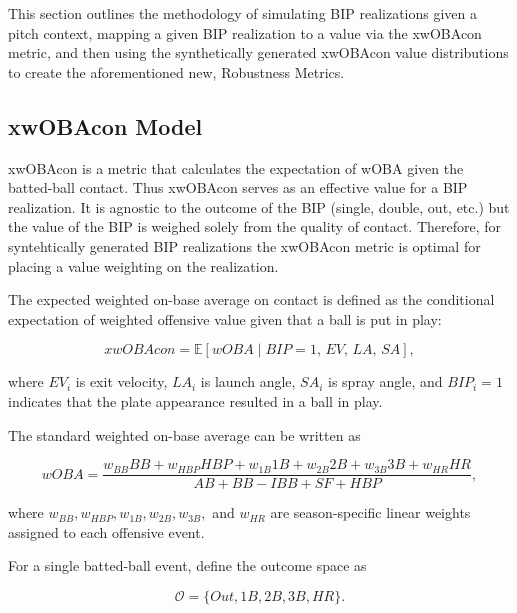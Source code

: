 \documentclass[11pt]{article}
\begin{document}
This section outlines the methodology of simulating BIP realizations given a pitch context, mapping a given BIP realization to a value via the xwOBAcon metric, and then using the synthetically generated xwOBAcon value distributions to create the aforementioned new, Robustness Metrics.

\subsection{xwOBAcon Model}

xwOBAcon is a metric that calculates the expectation of wOBA given the batted-ball contact. Thus xwOBAcon serves as an effective value for a BIP realization. It is agnostic to the outcome of the BIP (single, double, out, etc.) but the value of the BIP is weighed solely from the quality of contact. Therefore, for syntehtically generated BIP realizations the xwOBAcon metric is optimal for placing a value weighting on the realization.

The expected weighted on-base average on contact is defined as the conditional expectation of weighted offensive value given that a ball is put in play:

\begin{equation}
    xwOBAcon
    =
    \mathbb{E}
    \left[
        wOBA
        \mid
        BIP = 1,\,
        EV,\,
        LA,\,
        SA
    \right],
\end{equation}

where \(EV_i\) is exit velocity, \(LA_i\) is launch angle, \(SA_i\) is spray angle, and \(BIP_i = 1\) indicates that the plate appearance resulted in a ball in play.

The standard weighted on-base average can be written as

\begin{equation}
    wOBA
    =
    \frac{
        w_{BB}BB
        +
        w_{HBP}HBP
        +
        w_{1B}1B
        +
        w_{2B}2B
        +
        w_{3B}3B
        +
        w_{HR}HR
    }{
        AB + BB - IBB + SF + HBP
    },
\end{equation}

where \(w_{BB}, w_{HBP}, w_{1B}, w_{2B}, w_{3B},\) and \(w_{HR}\) are season-specific linear weights assigned to each offensive event.

For a single batted-ball event, define the outcome space as

\begin{equation}
    \mathcal{O}
    =
    \{Out, 1B, 2B, 3B, HR\}.
\end{equation}
\end{document}
